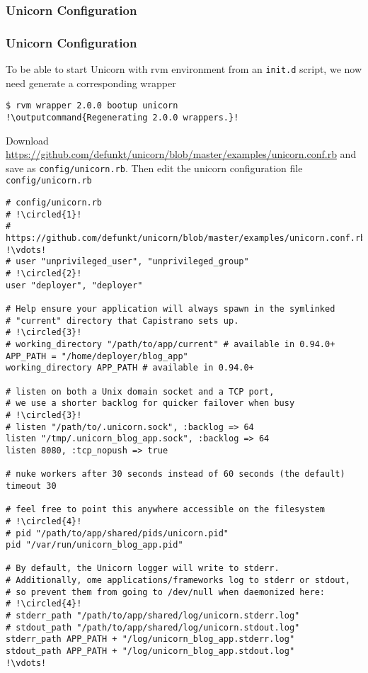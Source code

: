 \subsubsection{Unicorn Configuration}
\begin{frame}
\frametitle{Unicorn Configuration}

To be able to start Unicorn with \acrshort{rvm} environment from an \texttt{init.d} script, we now need generate a corresponding wrapper

\lstset{language=shell, escapechar=!}
\begin{lstlisting}[escapechar=!]
$ rvm wrapper 2.0.0 bootup unicorn
!\outputcommand{Regenerating 2.0.0 wrappers.}!
\end{lstlisting}

Download \href{https://github.com/defunkt/unicorn/blob/master/examples/unicorn.conf.rb}{https://github.com/defunkt/unicorn/blob/master/examples/unicorn.conf.rb}
and save as \texttt{config/unicorn.rb}. Then edit the unicorn configuration file \texttt{config/unicorn.rb}

\lstset{language=Ruby, style=eclipse}
\begin{lstlisting}[escapechar=!]
# config/unicorn.rb
# !\circled{1}!
# https://github.com/defunkt/unicorn/blob/master/examples/unicorn.conf.rb
!\vdots!
# user "unprivileged_user", "unprivileged_group"
# !\circled{2}!
user "deployer", "deployer"

# Help ensure your application will always spawn in the symlinked
# "current" directory that Capistrano sets up.
# !\circled{3}!
# working_directory "/path/to/app/current" # available in 0.94.0+
APP_PATH = "/home/deployer/blog_app"
working_directory APP_PATH # available in 0.94.0+

# listen on both a Unix domain socket and a TCP port,
# we use a shorter backlog for quicker failover when busy
# !\circled{3}!
# listen "/path/to/.unicorn.sock", :backlog => 64
listen "/tmp/.unicorn_blog_app.sock", :backlog => 64
listen 8080, :tcp_nopush => true

# nuke workers after 30 seconds instead of 60 seconds (the default)
timeout 30

# feel free to point this anywhere accessible on the filesystem
# !\circled{4}!
# pid "/path/to/app/shared/pids/unicorn.pid"
pid "/var/run/unicorn_blog_app.pid"

# By default, the Unicorn logger will write to stderr.
# Additionally, ome applications/frameworks log to stderr or stdout,
# so prevent them from going to /dev/null when daemonized here:
# !\circled{4}!
# stderr_path "/path/to/app/shared/log/unicorn.stderr.log"
# stdout_path "/path/to/app/shared/log/unicorn.stdout.log"
stderr_path APP_PATH + "/log/unicorn_blog_app.stderr.log"
stdout_path APP_PATH + "/log/unicorn_blog_app.stdout.log"
!\vdots!                                                                      
\end{lstlisting}
\end{frame}

